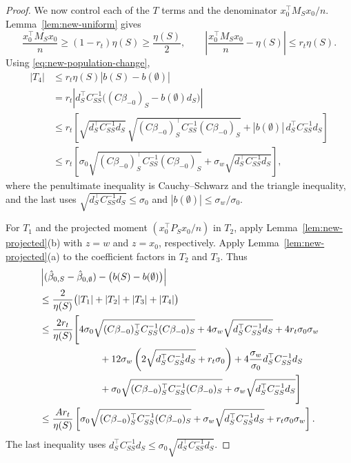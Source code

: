 \documentclass[a4paper,10pt,english]{article}
\theoremstyle{definition}
\begin{document}
\begin{review}
\begin{proof}
We now control each of the \(T\) terms and the denominator
\(x_0^\top M_Sx_0/n\).
\rbreak
Lemma~\ref{lem:new-uniform} gives
\[
 \frac{x_0^\top M_Sx_0}{n}
 \ge(1-r_t)\eta(S)\ge\frac{\eta(S)}2,\qquad
 \left|\frac{x_0^\top M_Sx_0}{n}-\eta(S)\right|
 \le r_t\eta(S).
\]
\rbreak
Using \eqref{eq:new-population-change},
\begin{equation}\label{eq:new-fourth-term}
 \begin{aligned}
 |T_4|
 &\le r_t\eta(S)|b(S)-b(\emptyset)|\\
 &=r_t\left|
 d_S^\top C_{SS}^{-1}
 \bigl((C\beta_{-0})_S-b(\emptyset)d_S\bigr)
 \right|\\
 &\le r_t\left[
 \sqrt{d_S^\top C_{SS}^{-1}d_S}\,
 \sqrt{(C\beta_{-0})_S^\top C_{SS}^{-1}(C\beta_{-0})_S}
 +|b(\emptyset)|\,d_S^\top C_{SS}^{-1}d_S
 \right]\\
 &\le r_t\left[
 \sigma_0
 \sqrt{(C\beta_{-0})_S^\top C_{SS}^{-1}(C\beta_{-0})_S}
 +\sigma_w\sqrt{d_S^\top C_{SS}^{-1}d_S}
 \right],
 \end{aligned}
\end{equation}
where the penultimate inequality is Cauchy--Schwarz and the triangle
inequality, and the last uses
\(\sqrt{d_S^\top C_{SS}^{-1}d_S}\le\sigma_0\) and
\(|b(\emptyset)|\le\sigma_w/\sigma_0\).

For \(T_1\) and the projected moment
\((x_0^\top P_Sx_0/n)\) in \(T_2\), apply
Lemma~\ref{lem:new-projected}(b) with \(z=w\) and \(z=x_0\), respectively.
\rbreak
Apply Lemma~\ref{lem:new-projected}(a) to the coefficient factors in
\(T_2\) and \(T_3\).
\rbreak
Thus
\begin{equation}\label{eq:new-assembly}
 \begin{aligned}
 &\left|
 (\hat\beta_{0,S}-\hat\beta_{0,\emptyset})
 -\bigl(b(S)-b(\emptyset)\bigr)
 \right|\\
 &\le
 \frac{2}{\eta(S)}
 \bigl(|T_1|+|T_2|+|T_3|+|T_4|\bigr)\\
 &\le
 \frac{2r_t}{\eta(S)}
 \Bigg[
 4\sigma_0
 \sqrt{(C\beta_{-0})_S^\top C_{SS}^{-1}(C\beta_{-0})_S}
 +4\sigma_w\sqrt{d_S^\top C_{SS}^{-1}d_S}
 +4r_t\sigma_0\sigma_w\\
 &\hspace{22mm}
 +12\sigma_w
 \left(2\sqrt{d_S^\top C_{SS}^{-1}d_S}+r_t\sigma_0\right)
 +4\frac{\sigma_w}{\sigma_0}d_S^\top C_{SS}^{-1}d_S\\
 &\hspace{22mm}
 +\sigma_0
 \sqrt{(C\beta_{-0})_S^\top C_{SS}^{-1}(C\beta_{-0})_S}
 +\sigma_w\sqrt{d_S^\top C_{SS}^{-1}d_S}
 \Bigg]\\
 &\le
 \frac{A r_t}{\eta(S)}
 \left[
 \sigma_0
 \sqrt{(C\beta_{-0})_S^\top C_{SS}^{-1}(C\beta_{-0})_S}
 +\sigma_w\sqrt{d_S^\top C_{SS}^{-1}d_S}
 +r_t\sigma_0\sigma_w
 \right].
 \end{aligned}
\end{equation}
The last inequality uses
\(d_S^\top C_{SS}^{-1}d_S
\le\sigma_0\sqrt{d_S^\top C_{SS}^{-1}d_S}\).
\end{proof}


\end{review}
\end{document}
